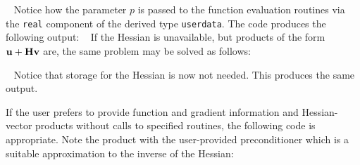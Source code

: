 \documentclass{galahad}
\begin{document}
{\tt \small
\VerbatimInput{\packageexample}
}
\noindent
Notice how the parameter $p$ is passed to the function evaluation
routines via the {\tt real} component of the derived type {\tt userdata}.
The code produces the following output:
{\tt \small
\VerbatimInput{\packageresults}
}
\noindent
If the Hessian is unavailable, but products of the form
${\mathbf{u}} + {\mathbf{H}} {\mathbf{v}}$ are, the same problem may be solved as follows:

{\tt \small
\VerbatimInput{\packageexampleb}
}
\noindent
Notice that storage for the Hessian is now not needed.
This produces the same output.

If the user prefers to provide function and gradient information and
Hessian-vector products
without calls to specified routines, the following code is appropriate.
Note the product with the user-provided preconditioner
which is a suitable approximation to the inverse of the Hessian:

{\tt \small
\VerbatimInput{\packageexamplec}
}
\noindent
\noindent
\end{document}

